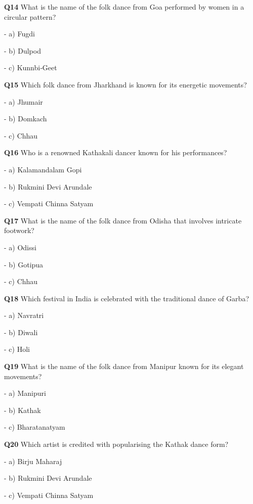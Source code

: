 \textbf{Q14} What is the name of the folk dance from Goa performed by women in a circular pattern?\par
\quad - a) Fugdi\par
\quad - b) Dulpod\par
\quad - c) Kunnbi‑Geet\par

\textbf{Q15} Which folk dance from Jharkhand is known for its energetic movements?\par
\quad - a) Jhumair\par
\quad - b) Domkach\par
\quad - c) Chhau\par

\textbf{Q16} Who is a renowned Kathakali dancer known for his performances?\par
\quad - a) Kalamandalam Gopi\par
\quad - b) Rukmini Devi Arundale\par
\quad - c) Vempati Chinna Satyam\par

\textbf{Q17} What is the name of the folk dance from Odisha that involves intricate footwork?\par
\quad - a) Odissi\par
\quad - b) Gotipua\par
\quad - c) Chhau\par

\textbf{Q18} Which festival in India is celebrated with the traditional dance of Garba?\par
\quad - a) Navratri\par
\quad - b) Diwali\par
\quad - c) Holi\par

\textbf{Q19} What is the name of the folk dance from Manipur known for its elegant movements?\par
\quad - a) Manipuri\par
\quad - b) Kathak\par
\quad - c) Bharatanatyam\par

\textbf{Q20} Which artist is credited with popularising the Kathak dance form?\par
\quad - a) Birju Maharaj\par
\quad - b) Rukmini Devi Arundale\par
\quad - c) Vempati Chinna Satyam\par

